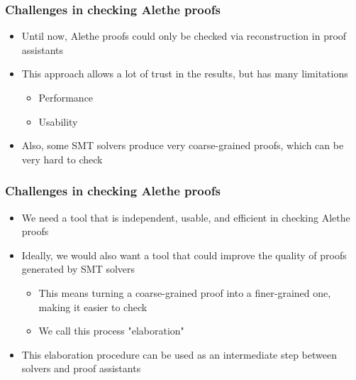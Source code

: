 \documentclass[usepdftitle=false,aspectratio=169]{beamer}
\newcommand\vitem{\vfill\item}
\begin{document}
\begin{frame}
  \frametitle{Challenges in checking Alethe proofs}
  \begin{itemize}
    \item Until now, Alethe proofs could only be checked via reconstruction in
    proof assistants
    \vitem This approach allows a lot of trust in the results, but has many
    limitations
    \begin{itemize}
      \item Performance
      \item Usability
    \end{itemize}
    \vitem Also, some SMT solvers produce very coarse-grained proofs, which can
    be very hard to check
  \end{itemize}
\end{frame}

\begin{frame}
  \frametitle{Challenges in checking Alethe proofs}
  \begin{itemize}
    \item We need a tool that is independent, usable, and efficient in checking
    Alethe proofs
    \vitem Ideally, we would also want a tool that could improve the quality of
    proofs generated by SMT solvers
    \begin{itemize}
      \item This means turning a coarse-grained proof into a finer-grained
        one, making it easier to check
      \item We call this process "elaboration"
    \end{itemize}
    \vitem This elaboration procedure can be used as an intermediate step
    between solvers and proof assistants
  \end{itemize}
\end{frame}
\end{document}
